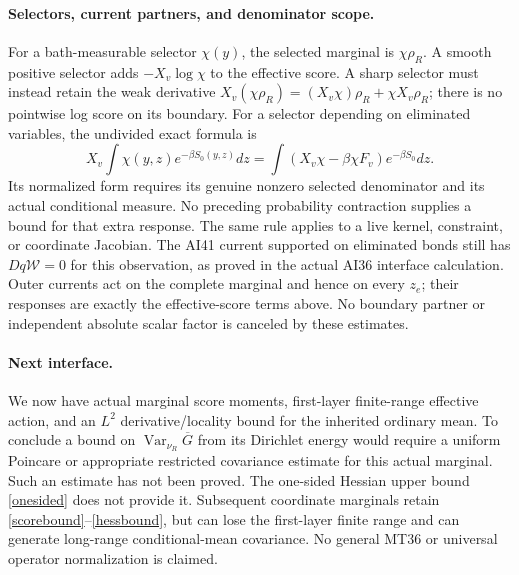 \documentclass[11pt]{article}
\newcommand{\Var}{\operatorname{Var}}
\begin{document}
\paragraph{Selectors, current partners, and denominator scope.}
For a bath-measurable selector $\chi(y)$, the selected marginal is $\chi\rho_R$.
A smooth positive selector adds $-X_v\log\chi$ to the effective score.
A sharp selector must instead retain the weak derivative
$X_v(\chi\rho_R)=(X_v\chi)\rho_R+\chi X_v\rho_R$; there is no pointwise log score
on its boundary. For a selector depending on eliminated variables, the undivided exact
formula is
\[
 X_v\int\chi(y,z)e^{-\beta S_0(y,z)}dz
 =\int(X_v\chi-\beta\chi F_v)e^{-\beta S_0}dz.
\]
Its normalized form requires its genuine nonzero selected denominator and its actual
conditional measure. No preceding probability contraction supplies a bound for that extra
response. The same rule applies to a live kernel, constraint, or coordinate Jacobian.
The AI41 current supported on eliminated bonds still has $Dq\mathcal W=0$ for this
observation, as proved in the actual AI36 interface calculation. Outer currents act on the complete marginal and hence
on every $z_e$; their responses are exactly the effective-score terms above. No boundary
partner or independent absolute scalar factor is canceled by these estimates.

\paragraph{Next interface.}
We now have actual marginal score moments, first-layer finite-range effective action, and
an $L^2$ derivative/locality bound for the inherited ordinary mean. To conclude a bound
on $\Var_{\nu_R}\overline G$ from its Dirichlet energy would require a uniform Poincare
or appropriate restricted covariance estimate for this actual marginal. Such an estimate
has not been proved. The one-sided Hessian upper bound \eqref{onesided} does not provide
it. Subsequent coordinate marginals retain \eqref{scorebound}--\eqref{hessbound}, but
can lose the first-layer finite range and can generate long-range conditional-mean covariance.
No general MT36 or universal operator normalization is claimed.
\end{document}
